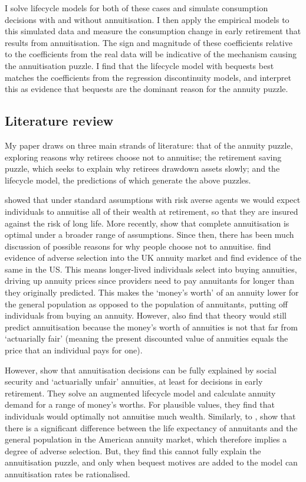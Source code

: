 \documentclass[12pt]{article}
\begin{document}
I solve lifecycle models for both of these cases and simulate consumption decisions with and without annuitisation.
I then apply the empirical models to this simulated data and measure the consumption change in early retirement that results from annuitisation.
The sign and magnitude of these coefficients relative to the coefficients from the real data will be indicative of the mechanism causing the annuitisation puzzle.
I find that the lifecycle model with bequests best matches the coefficients from the regression discontinuity models, and interpret this as evidence that bequests are the dominant reason for the annuity puzzle.

\subsection{Literature review}
My paper draws on three main strands of literature: that of the annuity puzzle,
exploring reasons why retirees choose not to annuitise; the retirement
saving puzzle, which seeks to explain why retirees drawdown assets slowly; and
the lifecycle model, the predictions of which generate the above puzzles.

\cite{yaari-65} showed that under standard assumptions with risk averse agents
we would expect individuals to annuitise all of their wealth at retirement, so
that they are insured against the risk of long life. More recently,
\cite{davidoff-brown-diamond-aer-2005} show that complete annuitisation is
optimal under a broader range of assumptions. Since then, there has been much
discussion of possible reasons for why people choose not to annuitise.
\cite{finkelstein-porteba-2002, finkelstein-porteba-2004} find evidence of
adverse selection into the UK annuity market and \cite{mitchell-et-al-1999} find
evidence of the same in the US. This means longer-lived individuals select into
buying annuities, driving up annuity prices since providers need to pay
annuitants for longer than they originally predicted. This
makes the `money's worth' of an annuity lower for the general population as
opposed to the population of annuitants, putting off individuals from buying an
annuity. However, \cite{mitchell-et-al-1999} also find that theory would still
predict annuitisation because the money's worth of annuities is not that far
from `actuarially fair' (meaning the present discounted value of annuities
equals the price that an individual pays for one).

However, \cite{friedman-warshawsky-qje-1990} show that annuitisation decisions
can be fully explained by social security and `actuarially unfair' annuities, at
least for decisions in early retirement. They solve an augmented lifecycle model
and calculate annuity demand for a range of money's worths. For plausible values,
they find that individuals would optimally not annuitise much wealth. Similarly,
to \cite{finkelstein-porteba-2004}, \cite{friedman-warshawsky-chicago-1988} show
that there is a significant difference between the life expectancy of annuitants
and the general population in the American annuity market, which therefore
implies a degree of adverse selection. But, they find this cannot fully explain
the annuitisation puzzle, and only when bequest motives are added to the model
can annuitisation rates be rationalised.
\end{document}
